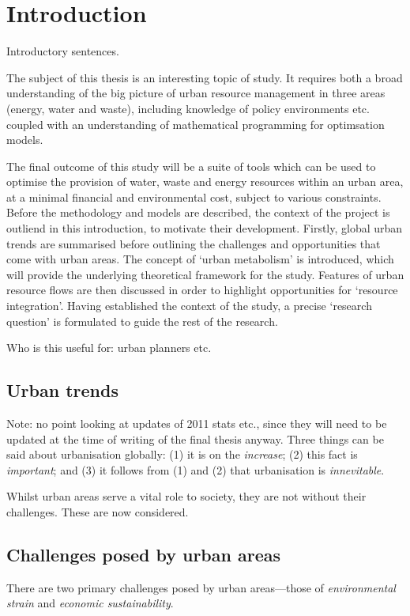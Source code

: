 \section{Introduction}
Introductory sentences.

The subject of this thesis is an interesting topic of study. It requires both a broad understanding of the big picture of urban resource management in three areas (energy, water and waste), including knowledge of policy environments etc. coupled with an understanding of mathematical programming for optimsation models.

The final outcome of this study will be a suite of tools which can be used to optimise the provision of water, waste and energy resources within an urban area, at a minimal financial and environmental cost, subject to various constraints. Before the methodology and models are described, the context of the project is outliend in this introduction, to motivate their development. Firstly, global urban trends are summarised before outlining the challenges and opportunities that come with urban areas. The concept of `urban metabolism' is introduced, which will provide the underlying theoretical framework for the study. Features of urban resource flows are then discussed in order to highlight opportunities for `resource integration'. Having established the context of the study, a precise `research question' is formulated to guide the rest of the research.

Who is this useful for: urban planners etc.

\subsection{Urban trends}
Note: no point looking at updates of  2011 stats etc., since they will need to be updated at the time of writing of the final thesis anyway.
Three things can be said about urbanisation globally: (1) it is on the \emph{increase}; (2) this fact is \emph{important}; and (3) it follows from (1) and (2) that urbanisation is \emph{innevitable}.

Whilst urban areas serve a vital role to society, they are not without their challenges. These are now considered.

\subsection{Challenges posed by urban areas}
There are two primary challenges posed by urban areas---those of \emph{environmental strain} and \emph{economic sustainability}.

